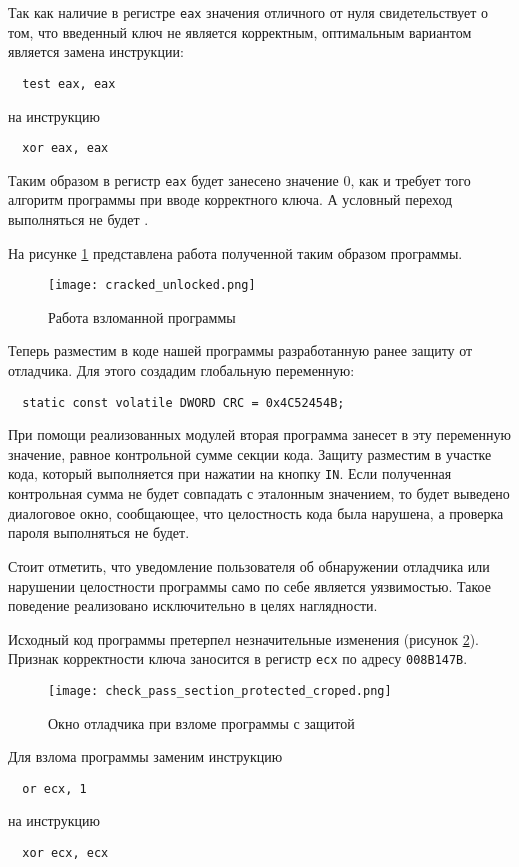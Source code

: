 Так как наличие в регистре \verb!eax! значения отличного от нуля свидетельствует
о том, что введенный ключ не является корректным, оптимальным вариантом является
замена инструкции:
\begin{verbatim}
  test eax, eax
\end{verbatim}
на инструкцию
\begin{verbatim}
  xor eax, eax
\end{verbatim}
Таким образом в регистр \verb!eax! будет занесено значение 0, как и требует того
алгоритм программы при вводе корректного ключа. А условный переход выполняться
не будет .

На рисунке \ref{fig:cracked_unlock} представлена работа полученной таким образом
программы.
\begin{figure}[htpb]
  \centering
  \texttt{[image: cracked\_unlocked.png]}
  \caption{Работа взломанной программы}
  \label{fig:cracked_unlock}
\end{figure}

Теперь разместим в коде нашей программы разработанную ранее защиту от отладчика. 
Для этого создадим глобальную переменную:
\begin{verbatim}
  static const volatile DWORD CRC = 0x4C52454B;
\end{verbatim}
При помощи реализованных модулей вторая программа занесет в эту переменную
значение, равное контрольной сумме секции кода. Защиту разместим в участке кода,
который выполняется при нажатии на кнопку \verb!IN!. Если полученная контрольная
сумма не будет совпадать с эталонным значением, то будет выведено диалоговое
окно, сообщающее, что целостность кода была нарушена, а проверка пароля
выполняться не будет.

Стоит отметить, что уведомление пользователя об обнаружении отладчика или
нарушении целостности программы само по себе является уязвимостью. Такое
поведение реализовано исключительно в целях наглядности.

Исходный код программы претерпел незначительные изменения (рисунок
\ref{fig:protected_code}). Признак корректности ключа заносится в регистр
\verb!ecx! по адресу \verb!008B147B!.

\begin{figure}[htpb]
  \centering
  \texttt{[image: check\_pass\_section\_protected\_croped.png]}
  \caption{Окно отладчика при взломе программы с защитой}
  \label{fig:protected_code}
\end{figure}

Для взлома программы заменим инструкцию
\begin{verbatim}
  or ecx, 1
\end{verbatim}
на инструкцию
\begin{verbatim}
  xor ecx, ecx  
\end{verbatim}

